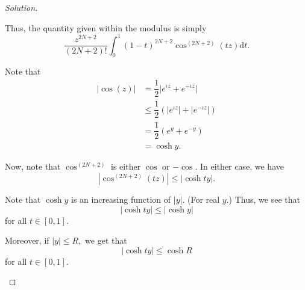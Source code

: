 \documentclass[12pt]{article}
\theoremstyle{definition}
\numberwithin{thm}{section}
\newenvironment{soln}{\begin{proof}[Solution]}{\end{proof}}
\begin{document}
\begin{enumerate}
\begin{soln}
\begin{enumerate}
		Thus, the quantity given within the modulus is simply
		\begin{equation*} 
			\dfrac{z^{2N+2}}{(2N + 2)!}\int_{0}^{1} (1 - t)^{2N + 2}\cos^{(2N+2)}(tz){\mathrm{d}}t.
		\end{equation*}

		Note that
		\begin{align*} 
			|\cos(z)| &= \dfrac{1}{2}\left|e^{\iota z} + e^{-\iota z}\right|\\
			&\le\dfrac{1}{2}\left(\left|e^{\iota z}\right| + \left|e^{-\iota z}\right|\right)\\
			&=\dfrac{1}{2}(e^y + e^{-y})\\
			&=\cosh y.
		\end{align*}

		Now, note that $\cos^{(2N+2)}$ is either $\cos$ or $-\cos.$ In either case, we have
		\begin{equation*} 
			\left|\cos^{(2N+2)}(tz)\right| \le \left|\cosh ty\right|.
		\end{equation*}

		Note that $\cosh y$ is an increasing function of $|y|.$ (For real $y$.) Thus, we see that
		\begin{equation*} 
			\left|\cosh ty\right| \le \left|\cosh y\right|
		\end{equation*}
		for all $t \in [0, 1].$

		Moreover, if $|y| \le R,$ we get that
		\begin{equation*} 
			\left|\cosh ty\right| \le \cosh R
		\end{equation*}
		for all $t \in [0, 1].$


\end{enumerate}
\end{soln}
\end{enumerate}
\end{document}
